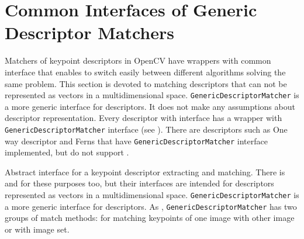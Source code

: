 \section{Common Interfaces of Generic Descriptor Matchers}
Matchers of keypoint descriptors in OpenCV have wrappers with common interface that enables to switch easily 
between different algorithms solving the same problem. This section is devoted to matching descriptors 
that can not be represented as vectors in a multidimensional space. \texttt{GenericDescriptorMatcher} 
is a more generic interface for descriptors. It does not make any assumptions about descriptor representation. 
Every descriptor with  interface has a wrapper with 
\texttt{GenericDescriptorMatcher} interface (see ). 
There are descriptors such as One way descriptor and Ferns that have \texttt{GenericDescriptorMatcher} 
interface implemented, but do not support .

Abstract interface for a keypoint descriptor extracting and matching. 
There is  and  
for these purposes too, but their interfaces are intended for descriptors 
represented as vectors in a multidimensional space. \texttt{GenericDescriptorMatcher} 
is a more generic interface for descriptors.
As , \texttt{GenericDescriptorMatcher} has two groups 
of match methods: for matching keypoints of one image with other image or
with image set.
 
